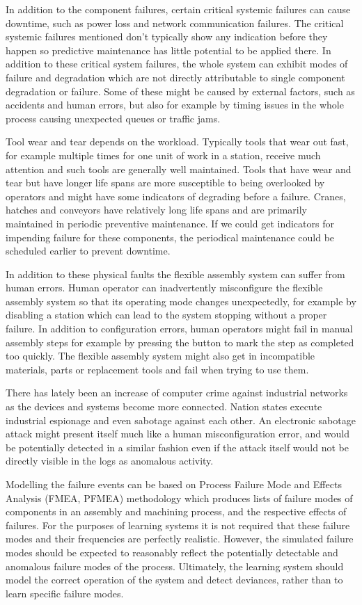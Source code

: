 \documentclass[journal]{IEEEtran}
\begin{document}
In addition to the component failures, certain critical systemic failures can cause downtime, such as power loss and network communication failures.
The critical systemic failures mentioned don't typically show any indication before they happen so predictive maintenance has little potential to be applied there.
In addition to these critical system failures,
the whole system can exhibit modes of failure and degradation which are not directly attributable to single component degradation or failure.
Some of these might be caused by
external factors, such as accidents and human errors, but also for example by timing issues in the whole process causing unexpected queues or traffic jams.

Tool wear and tear depends on the workload. Typically tools that wear out fast, for example multiple times for one unit of work in a station, receive much attention and such tools are generally
well maintained. Tools that have wear and tear but have longer life spans are more susceptible to being overlooked by operators and might have some indicators of degrading
before a failure. Cranes, hatches and conveyors have relatively long life spans and are primarily maintained in periodic preventive maintenance. If we could get indicators
for impending failure for these components, the periodical maintenance could be scheduled earlier to prevent downtime.

In addition to these physical faults the flexible
assembly system can suffer from human errors. Human operator can inadvertently misconfigure the flexible assembly system so that its operating mode changes unexpectedly,
for example by disabling a station which can lead to the system stopping without a proper failure. In addition to configuration
errors, human operators might fail in manual assembly steps for example by pressing the button to mark the step
as completed too quickly.
The flexible assembly system might also get in incompatible materials, parts or replacement tools and fail when trying to use them.

There has lately been an increase of computer crime against industrial networks as the devices and systems become more connected.
Nation states execute industrial espionage and even sabotage against each other\cite{stuxnet}. An electronic sabotage attack might present itself
much like a human misconfiguration error, and would be potentially detected in a similar fashion even if the attack itself would not be
directly visible in the logs as anomalous activity.

Modelling the failure events can be based on Process Failure Mode and Effects Analysis (FMEA, PFMEA) \cite{teng1996failure} methodology which produces lists of
failure modes of components
in an assembly and machining process, and the respective effects of failures. For the purposes of learning systems it is not required that these failure modes and their frequencies
are perfectly realistic. However, the simulated failure modes should be expected to reasonably reflect the potentially detectable and anomalous failure modes of the process.
Ultimately, the learning system should model the correct operation of the system and detect deviances, rather than to learn specific failure modes.
\end{document}
